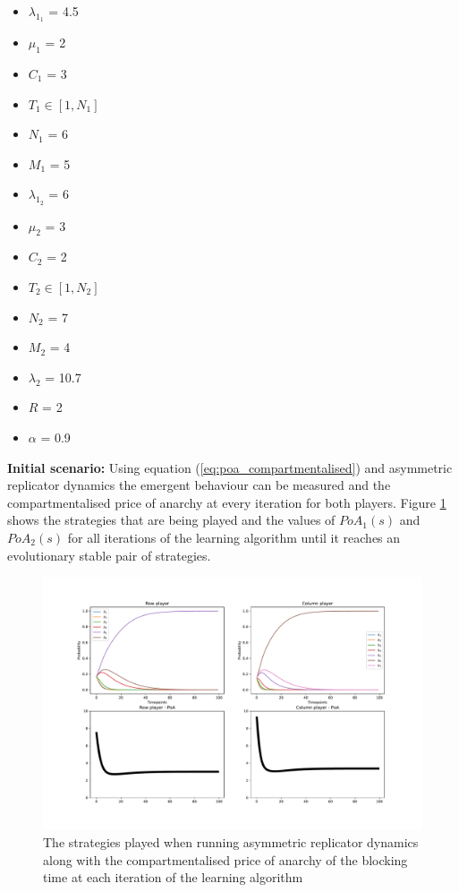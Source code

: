 \begin{multicols}{3}
    \begin{itemize}        
        \item \( \lambda_{1_1} \) = 4.5
        \item \( \mu_1 \) = 2
        \item \( C_1 \) = 3
        \item \( T_1 \in [1, N_1] \) 
        \item \( N_1 \) = 6
        \item \( M_1 \) = 5

        \columnbreak
        \item \( \lambda_{1_2} \) = 6
        \item \( \mu_2 \) = 3
        \item \( C_2 \) = 2
        \item \( T_2 \in [1, N_2] \)
        \item \( N_2 \) = 7
        \item \( M_2 \) = 4
        
        \columnbreak
        \item \( \lambda_2 \) = 10.7
        \item \( R \) = 2
        \item \( \alpha \) = 0.9
    \end{itemize}
\end{multicols}

\textbf{Initial scenario:}
Using equation (\ref{eq:poa_compartmentalised}) and asymmetric replicator 
dynamics the emergent behaviour can be measured and the compartmentalised price of 
anarchy at every iteration for both players.
Figure \ref{fig:ard_original} shows the strategies that are being played and 
the values of \(PoA_1(s)\) and \(PoA_2(s)\) for all iterations of the 
learning algorithm until it reaches an evolutionary stable pair of strategies.

\begin{figure}[H]
    \includegraphics[width=\textwidth]{imgs/asymmetric_rd_and_PoA/asymmetric_original.pdf}
    \caption{The strategies played when running asymmetric replicator dynamics
    along with the compartmentalised price of anarchy of the blocking time at
    each iteration of the learning algorithm}
    \label{fig:ard_original}
\end{figure}


